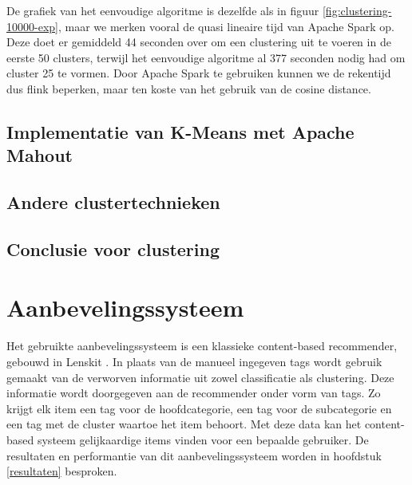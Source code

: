 De grafiek van het eenvoudige algoritme is dezelfde als in figuur \ref{fig:clustering-10000-exp}, maar we merken vooral de quasi lineaire tijd van Apache Spark op. Deze doet er gemiddeld 44 seconden over om een clustering uit te voeren in de eerste 50 clusters, terwijl het eenvoudige algoritme al 377 seconden nodig had om cluster 25 te vormen. Door Apache Spark te gebruiken kunnen we de rekentijd dus flink beperken, maar ten koste van het gebruik van de cosine distance.

\subsection{Implementatie van K-Means met Apache Mahout}\label{mahout}


\subsection{Andere clustertechnieken}

\subsection{Conclusie voor clustering}


\section{Aanbevelingssysteem}
Het gebruikte aanbevelingssysteem is een klassieke content-based recommender, gebouwd in Lenskit \cite{Ekstrand2011a}. In plaats van de manueel ingegeven tags wordt gebruik gemaakt van de verworven informatie uit zowel classificatie als clustering. Deze informatie wordt doorgegeven aan de recommender onder vorm van tags. Zo krijgt elk item een tag voor de hoofdcategorie, een tag voor de subcategorie en een tag met de cluster waartoe het item behoort. Met deze data kan het content-based systeem gelijkaardige items vinden voor een bepaalde gebruiker. De resultaten en performantie van dit aanbevelingssysteem worden in hoofdstuk \ref{resultaten} besproken.